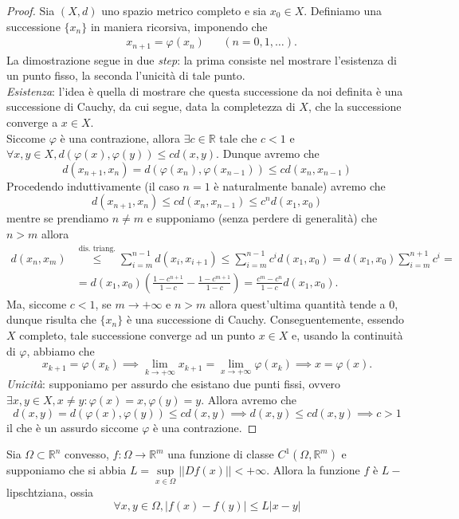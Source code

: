 \begin{proof}
	Sia $(X, d)$ uno spazio metrico completo e sia $x_0 \in X$. Definiamo una successione $\{ x_n \}$ in maniera ricorsiva, imponendo che
	\begin{align*}
		&x_{n+1} = \varphi(x_n) & &(n = 0, 1, \ldots).
	\end{align*}
	La dimostrazione segue in due \emph{step}: la prima consiste nel mostrare l'esistenza di un punto fisso, la seconda l'unicità di tale punto. \\
	\emph{Esistenza}: l'idea è quella di mostrare che questa successione da noi definita è una successione di Cauchy, da cui segue, data la completezza di $X$, che la successione converge a $x \in X$. \\
	Siccome $\varphi$ è una contrazione, allora $\exists c \in \mathbb{R}$ tale che $c < 1$ e $\forall x, y \in X, d(\varphi(x), \varphi(y)) \leq c d(x, y)$. Dunque avremo che
	$$
	d(x_{n+1}, x_n) = d(\varphi(x_n), \varphi(x_{n-1})) \leq c d(x_n, x_{n-1})
	$$
	Procedendo induttivamente (il caso $n=1$ è naturalmente banale) avremo che
	$$
	d(x_{n+1}, x_n) \leq c d(x_n, x_{n-1}) \leq c^n d(x_1, x_0)
	$$
	mentre se prendiamo $n \neq m$ e supponiamo (senza perdere di generalità) che $n > m$ allora
	\begin{align*}
	d(x_n, x_m) &\stackrel{\text{dis. triang.}}{\leq} \sum_{i = m}^{n-1} d(x_i, x_{i+1}) \leq \sum_{i=m}^{n-1} c^{i} d(x_1, x_0) = d(x_1, x_0) \sum_{i=m}^{n+1} c^{i} = \\
	&= d(x_1, x_0) \left( \frac{1-c^{n+1}}{1-c} - \frac{1 - c^{m+1}}{1-c} \right) = \frac{c^{m} - c^{n}}{1-c} d(x_1, x_0).
	\end{align*}
	Ma, siccome $c < 1$, se $m \to +\infty$ e $n > m$ allora quest'ultima quantità tende a $0$, dunque risulta che $\{ x_n \}$ è una successione di Cauchy. Conseguentemente, essendo $X$ completo,
	tale successione converge ad un punto $x \in X$ e, usando la continuità di $\varphi$, abbiamo che
	$$
	x_{k+1} = \varphi(x_k) \implies \lim_{k \to +\infty} x_{k+1} = \lim_{x \to +\infty} \varphi(x_k) \implies x = \varphi(x).
	$$
	\emph{Unicità}: supponiamo per assurdo che esistano due punti fissi, ovvero $\exists x, y \in X, x \neq y : \varphi(x) = x, \varphi(y) = y$. Allora avremo che
	$$
	d(x, y) = d(\varphi(x), \varphi(y)) \leq c d(x, y) \implies d(x, y) \leq c d(x, y) \implies c > 1
	$$
	il che è un assurdo siccome $\varphi$ è una contrazione.
\end{proof}
\begin{theorem}
	Sia $\Omega \subset \mathbb{R}^n$ convesso, $f: \Omega \to \mathbb{R}^m$ una funzione di classe $C^1(\Omega, \mathbb{R}^m)$ e supponiamo che si abbia $L = \sup\limits_{x \in \Omega} ||Df(x)|| < +\infty$. Allora la funzione
	$f$ è $L-$lipschtziana, ossia
	$$
	\forall x, y \in \Omega, |f(x) - f(y)| \leq L|x-y|
	$$
\end{theorem}
